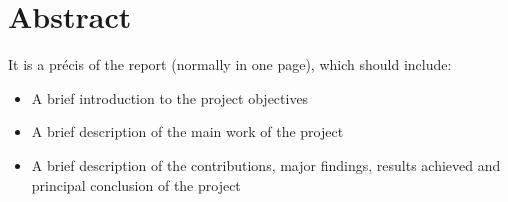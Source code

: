 \chapter*{Abstract}
	It is a précis of the report (normally in one page), which should include:
\begin{itemize}
	\item A brief introduction to the project objectives
	\item A brief description of the main work of the project
	\item A brief description of the contributions, major findings, results achieved and principal conclusion of the project
\end{itemize}
